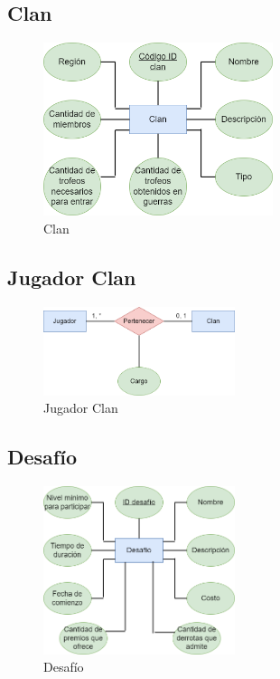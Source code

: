 \subsection{Clan}
\begin{figure}[H]
\centering
\includegraphics[width=0.60\textwidth]{../images/merx_clan.png}
\caption{Clan}
\end{figure}

\subsection{Jugador Clan}
\begin{figure}[H]
\centering
\includegraphics[width=0.5\textwidth]{../images/merx_playerclan.png}
\caption{Jugador Clan}
\end{figure}

\subsection{Desafío}
\begin{figure}[H]
\centering
\includegraphics[width=0.5\textwidth]{../images/merx_challenge.png}
\caption{Desafío}
\end{figure}

